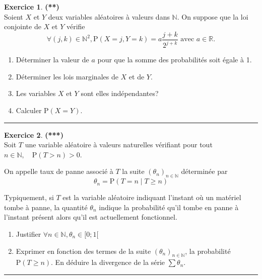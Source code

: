 \documentclass[a4paper,11pt]{article}
\theoremstyle{definition}
\newtheorem{exo}{Exercice} %
\begin{document}
\begin{minipage}{1\linewidth}
\begin{minipage}[t]{0.48\linewidth}
		
		\begin{exo}\textbf{(**)}\quad\\[0.2cm]
			
			Soient $X$ et $Y$ deux variables aléatoires à valeurs dans $\mathbb{N}$.
			On suppose que la loi conjointe de $X$ et $Y$ vérifie
			$$
			\displaystyle\forall(j, k) \in \mathbb{N}^{2}, \mathrm{P}(X=j, Y=k)=a \frac{j+k}{2^{j+k}} \text { avec } a \in \mathbb{R} .
			$$
			\begin{enumerate}
				\item Déterminer la valeur de $a$ pour que la somme des probabilités soit égale à 1.
				\item Déterminer les lois marginales de $X$ et de $Y$. 
				\item Les variables $X$ et $Y$ sont elles indépendantes?
				\item Calculer $\mathrm{P}(X=Y)$.
			\end{enumerate}
			
			\centering\rule{1\linewidth}{0.6pt}\end{exo}
		
		\begin{exo}\textbf{(***)}\quad\\[0.2cm]
			
			Soit $T$ une variable aléatoire à valeurs naturelles vérifiant pour tout $n \in \mathbb{N}, \quad \mathrm{P}(T>n)>0$.
			
			On appelle taux de panne associé à $T$ la suite $\left(\theta_{n}\right)_{n \in \mathbb{N}}$ déterminée par
			$$
			\theta_{n}=\mathrm{P}(T=n \mid T \geq n)
			$$
			
			Typiquement, si $T$ est la variable aléatoire indiquant l'instant où un matériel tombe à panne, la quantité $\theta_{n}$ indique la probabilité qu'il tombe en panne à l'instant présent alors qu'il est actuellement fonctionnel.
			
			\begin{enumerate}
				\item Justifier $ \forall n \in \mathbb{N}, \theta_{n} \in[0 ; 1[$	
				\item Exprimer en fonction des termes de la suite $\left(\theta_{n}\right)_{n \in \mathbb{N}}$, la probabilité $\mathrm{P}(T \geq n)$. En déduire la divergence de la série $\sum \theta_{n}$.
			\end{enumerate}

			
			
			\centering\rule{1\linewidth}{0.6pt}\end{exo}
		
\end{minipage}\end{minipage}
\end{document}
